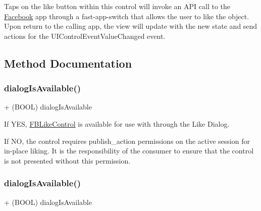 Taps on the like button within this control will invoke an A\+PI call to the \hyperlink{interfaceFacebook}{Facebook} app through a fast-\/app-\/switch that allows the user to like the object. Upon return to the calling app, the view will update with the new state and send actions for the U\+I\+Control\+Event\+Value\+Changed event. 

\subsection{Method Documentation}
\mbox{\label{interfaceFBLikeControl_a31182182d8e02669ba4bc6cec96e9111}} 
\subsubsection{\texorpdfstring{dialog\+Is\+Available()}{dialogIsAvailable()}\hspace{0.1cm}{\footnotesize\ttfamily [1/5]}}
{\footnotesize\ttfamily + (B\+O\+OL) dialog\+Is\+Available \begin{DoxyParamCaption}{ }\end{DoxyParamCaption}}

If Y\+ES, \hyperlink{interfaceFBLikeControl}{F\+B\+Like\+Control} is available for use with through the Like Dialog.

If NO, the control requires publish\+\_\+action permissions on the active session for in-\/place liking. It is the responsibility of the consumer to ensure that the control is not presented without this permission. \mbox{\label{interfaceFBLikeControl_a31182182d8e02669ba4bc6cec96e9111}} 
\subsubsection{\texorpdfstring{dialog\+Is\+Available()}{dialogIsAvailable()}\hspace{0.1cm}{\footnotesize\ttfamily [2/5]}}
{\footnotesize\ttfamily + (B\+O\+OL) dialog\+Is\+Available \begin{DoxyParamCaption}{ }\end{DoxyParamCaption}}

